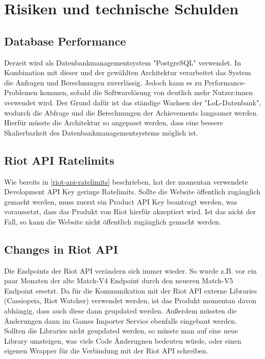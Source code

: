 \section{Risiken und technische Schulden}

\subsection{Database Performance}

Derzeit wird als Datenbankmanagementsystem "PostgreSQL" verwendet. In Kombination mit dieser und der gewählten Architektur verarbeitet das System die Anfragen und Berechnungen zuverlässig.
Jedoch kann es zu Performance-Problemen kommen, sobald die Softwarelösung von deutlich mehr Nutzer:innen verwendet wird. Der Grund dafür ist das ständige Wachsen der "LoL-Datenbank", wodurch die Abfrage und
die Berechnungen der Achievements langsamer werden. Hierfür müsste die Architektur so angepasst werden, dass eine bessere Skalierbarkeit des Datenbankmanagementsystems möglich ist.

\subsection{Riot API Ratelimits}
Wie bereits in \ref{riot-api-ratelimits} beschrieben, hat der momentan verwendete Development API Key geringe Ratelimits. Sollte die Website öffentlich zugänglich gemacht werden, muss zuerst ein Product API Key beantragt werden, was voraussetzt, dass das Produkt von Riot hierfür akzeptiert wird. Ist das nicht der Fall, so kann die Website nicht öffentlich zugänglich gemacht werden.

\subsection{Changes in Riot API}
Die Endpoints der Riot API verändern sich immer wieder. So wurde z.B. vor ein paar Monaten der alte Match-V4 Endpoint durch den neueren Match-V5 Endpoint ersetzt. Da für die Kommunikation mit der Riot API externe Libraries (Cassiopeia, Riot Watcher) verwendet werden, ist das Produkt momentan davon abhängig, dass auch diese dann geupdated werden.
Außerdem müssten die Änderungen dann im Games Importer Service ebenfalls eingebaut werden.\\ Sollten die Libraries nicht geupdated werden, so müsste man auf eine neue Library umsteigen, was viele Code Änderugnen bedeuten würde, oder einen eigenen Wrapper für die Verbindung mit der Riot API schreiben.


